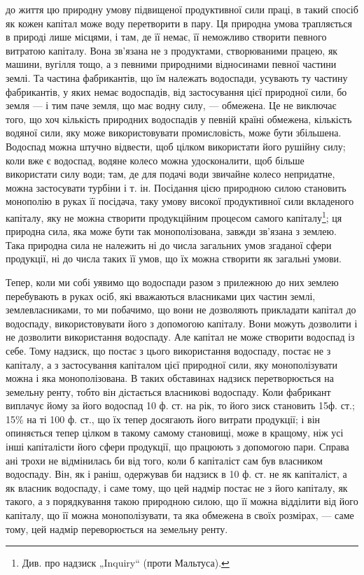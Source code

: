 \parcont{}  %
до життя цю природну умову підвищеної продуктивної сили праці, в такий
спосіб як кожен капітал може воду перетворити в пару. Ця природна умова
трапляється в природі лише місцями, і там, де її немає, її неможливо створити
певного витратою капіталу. Вона зв’язана не з продуктами, створюваними працею,
як машини, вугілля тощо, а з певними природними відносинами певної частини
землі. Та частина фабрикантів, що їм належать водоспади, усувають ту частину
фабрикантів, у яких немає водоспадів, від застосування цієї природної сили,
бо земля — і тим паче земля, що має водну силу, — обмежена. Це не виключає
того, що хоч кількість природних водоспадів у певній країні обмежена, кількість
водяної сили, яку може використовувати промисловість, може бути збільшена.
Водоспад можна штучно відвести, щоб цілком використати його рушійну силу;
коли вже є водоспад, водяне колесо можна удосконалити, щоб більше використати
силу води; там, де для подачі води звичайне колесо непридатне, можна застосувати
турбіни і т. ін. Посідання цією природною силою становить монополію
в руках її посідача, таку умову високої продуктивної сили вкладеного капіталу,
яку не можна створити продукційним процесом самого капіталу\footnote{
Див. про надзиск „Inquiry“ (проти Мальтуса).
}; ця природна
сила, яка може бути так монополізована, завжди зв’язана з землею. Така природна
сила не належить ні до числа загальних умов згаданої сфери продукції, ні до
числа таких її умов, що їх можна створити як загальні умови.

Тепер, коли ми собі уявимо що водоспади разом з прилежною до них землею
перебувають в руках осіб, які вважаються власниками цих частин землі,
землевласниками, то ми побачимо, що вони не дозволяють прикладати капітал
до водоспаду, використовувати його з допомогою капіталу. Вони можуть
дозволити і не дозволити використання водоспаду. Але капітал не може створити
водоспад із себе. Тому надзиск, що постає з цього використання водоспаду, постає
не з капіталу, а з застосування капіталом цієї природної сили, яку монополізувати
можна і яка монополізована. В таких обставинах надзиск перетворюється на земельну
ренту, тобто він дістається власникові водоспаду. Коли фабрикант виплачує
йому за його водоспад 10 ф. ст. на рік, то його зиск становить 15ф. ст.; 15\% на
ті 100 ф. ст., що їх тепер досягають його витрати продукції; і він опиняється
тепер цілком в такому самому становищі, може в кращому, ніж усі інші капіталісти
його сфери продукції, що працюють з допомогою пари. Справа ані трохи
не відмінилась би від того, коли б капіталіст сам був власником водоспаду. Він,
як і раніш, одержував би надзиск в 10 ф. ст. не як капіталіст, а як власник водоспаду,
і саме тому, що цей надмір постає не з його капіталу, як такого, а
з порядкування такою природною силою, що її можна відділити від його капіталу,
що її можна монополізувати, та яка обмежена в своїх розмірах, — саме тому, цей
надмір переворюється на земельну ренту.

